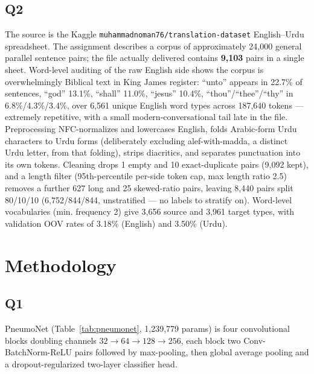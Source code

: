 \documentclass[conference]{IEEEtran}
\begin{document}
\subsection{Q2}
The source is the Kaggle \texttt{muhammadnoman76/translation-dataset}
English--Urdu spreadsheet. The assignment describes a corpus of
approximately 24,000 general parallel sentence pairs; the file actually
delivered contains \textbf{9,103} pairs in a single sheet. Word-level
auditing of the raw English side shows the corpus is overwhelmingly
Biblical text in King James register: ``unto'' appears in 22.7\% of
sentences, ``god'' 13.1\%, ``shall'' 11.0\%, ``jesus'' 10.4\%,
``thou''/``thee''/``thy'' in 6.8\%/4.3\%/3.4\%, over 6,561 unique
English word types across 187,640 tokens --- extremely repetitive, with
a small modern-conversational tail late in the file. Preprocessing
NFC-normalizes and lowercases English, folds Arabic-form Urdu
characters to Urdu forms (deliberately excluding alef-with-madda, a
distinct Urdu letter, from that folding), strips diacritics, and
separates punctuation into its own tokens. Cleaning drops 1 empty and 10 exact-duplicate
pairs (9,092 kept), and a length filter (95th-percentile per-side token
cap, max length ratio 2.5) removes a further 627 long and 25
skewed-ratio pairs, leaving 8,440 pairs split 80/10/10
(6,752/844/844, unstratified --- no labels to stratify on).
Word-level vocabularies (min. frequency 2) give 3,656 source and 3,961
target types, with validation OOV rates of 3.18\% (English) and 3.50\%
(Urdu).

\section{Methodology}

\subsection{Q1}
PneumoNet (Table~\ref{tab:pneumonet}, 1,239,779 params) is four
convolutional blocks doubling channels $32\to64\to128\to256$, each
block two Conv-BatchNorm-ReLU \cite{ioffe2015batchnorm} pairs followed
by max-pooling, then global average pooling and a dropout-regularized
two-layer classifier head.


\end{document}
